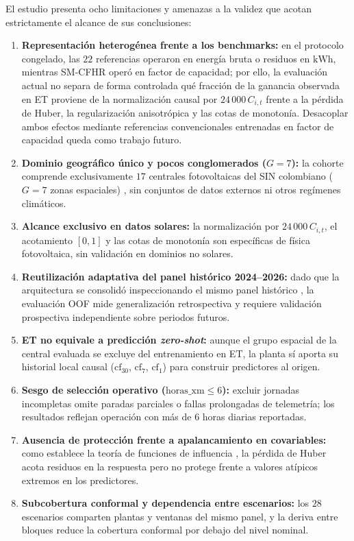 El estudio presenta ocho limitaciones y amenazas a la validez que acotan estrictamente el alcance de sus conclusiones:
\begin{enumerate}
    \item \textbf{Representación heterogénea frente a los benchmarks:} en el protocolo congelado, las $22$ referencias operaron en energía bruta o residuos en $\text{kWh}$, mientras SM-CFHR operó en factor de capacidad; por ello, la evaluación actual no separa de forma controlada qué fracción de la ganancia observada en ET proviene de la normalización causal por $24\,000\,C_{i,t}$ frente a la pérdida de Huber, la regularización anisotrópica y las cotas de monotonía. Desacoplar ambos efectos mediante referencias convencionales entrenadas en factor de capacidad queda como trabajo futuro.
    \item \textbf{Dominio geográfico único y pocos conglomerados ($G=7$):} la cohorte comprende exclusivamente $17$ centrales fotovoltaicas del SIN colombiano ($G=7$ zonas espaciales) \cite{cameron2015cluster}, sin conjuntos de datos externos ni otros regímenes climáticos.
    \item \textbf{Alcance exclusivo en datos solares:} la normalización por $24\,000\,C_{i,t}$, el acotamiento $[0,1]$ y las cotas de monotonía son específicas de física fotovoltaica, sin validación en dominios no solares.
    \item \textbf{Reutilización adaptativa del panel histórico 2024--2026:} dado que la arquitectura se consolidó inspeccionando el mismo panel histórico \cite{cawley2010overfit}, la evaluación OOF mide generalización retrospectiva y requiere validación prospectiva independiente sobre periodos futuros.
    \item \textbf{ET no equivale a predicción \textit{zero-shot}:} aunque el grupo espacial de la central evaluada se excluye del entrenamiento en ET, la planta sí aporta su historial local causal ($\mathrm{cf}_{30}$, $\mathrm{cf}_7$, $\mathrm{cf}_1$) para construir predictores al origen.
    \item \textbf{Sesgo de selección operativo ($\mathrm{horas\_xm} \le 6$):} excluir jornadas incompletas omite paradas parciales o fallas prolongadas de telemetría; los resultados reflejan operación con más de $6$ horas diarias reportadas.
    \item \textbf{Ausencia de protección frente a apalancamiento en covariables:} como establece la teoría de funciones de influencia \cite{hampel1986robust}, la pérdida de Huber acota residuos en la respuesta pero no protege frente a valores atípicos extremos en los predictores.
    \item \textbf{Subcobertura conformal y dependencia entre escenarios:} los $28$ escenarios comparten plantas y ventanas del mismo panel, y la deriva entre bloques reduce la cobertura conformal por debajo del nivel nominal.
\end{enumerate}
